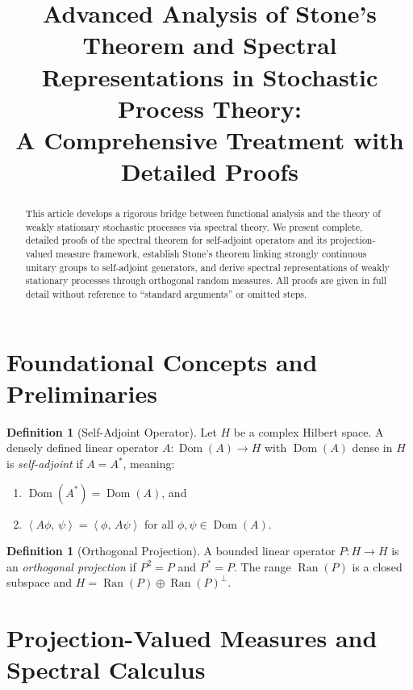 \documentclass[11pt]{article}
\title{Advanced Analysis of Stone's Theorem and Spectral Representations in Stochastic Process Theory:\\ A Comprehensive Treatment with Detailed Proofs}
\author{}
\date{}
\theoremstyle{definition}
\newtheorem{definition}[theorem]{Definition}
\theoremstyle{remark}
\newcommand{\1}{\mathbbm{1}}
\newcommand{\ip}[2]{\left\langle #1,\,#2 \right\rangle}
\DeclareMathOperator{\Dom}{Dom}
\DeclareMathOperator{\Ran}{Ran}
\begin{document}
\maketitle

\begin{abstract}
This article develops a rigorous bridge between functional analysis and the theory of weakly stationary stochastic processes via spectral theory. We present complete, detailed proofs of the spectral theorem for self-adjoint operators and its projection-valued measure framework, establish Stone's theorem linking strongly continuous unitary groups to self-adjoint generators, and derive spectral representations of weakly stationary processes through orthogonal random measures. All proofs are given in full detail without reference to ``standard arguments'' or omitted steps.
\end{abstract}

\tableofcontents

\section{Foundational Concepts and Preliminaries}

\begin{definition}[Self-Adjoint Operator]
Let $H$ be a complex Hilbert space. A densely defined linear operator $A:\Dom(A)\to H$ with $\Dom(A)$ dense in $H$ is \emph{self-adjoint} if $A=A^*$, meaning:
\begin{enumerate}[label=(\roman*)]
\item $\Dom(A^*)=\Dom(A)$, and
\item $\ip{A\phi}{\psi}=\ip{\phi}{A\psi}$ for all $\phi,\psi\in\Dom(A)$.
\end{enumerate}
\end{definition}

\begin{definition}[Orthogonal Projection]
A bounded linear operator $P:H\to H$ is an \emph{orthogonal projection} if $P^2=P$ and $P^*=P$. The range $\Ran(P)$ is a closed subspace and $H=\Ran(P)\oplus\Ran(P)^\perp$.
\end{definition}

\section{Projection-Valued Measures and Spectral Calculus}
\end{document}
